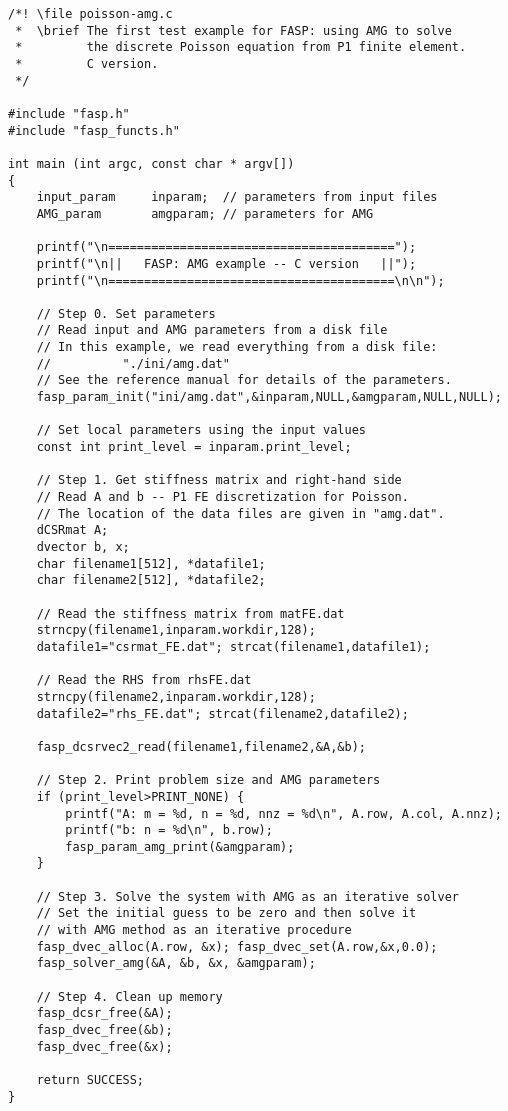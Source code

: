 \documentclass[11pt]{memoir}
\begin{document}
\begin{lstlisting}[stepnumber=1,firstnumber=1]
/*! \file poisson-amg.c
 *  \brief The first test example for FASP: using AMG to solve
 *         the discrete Poisson equation from P1 finite element.
 *         C version.
 */

#include "fasp.h"
#include "fasp_functs.h"

int main (int argc, const char * argv[])
{
    input_param     inparam;  // parameters from input files
    AMG_param       amgparam; // parameters for AMG

    printf("\n========================================");
    printf("\n||   FASP: AMG example -- C version   ||");
    printf("\n========================================\n\n");

    // Step 0. Set parameters
    // Read input and AMG parameters from a disk file
    // In this example, we read everything from a disk file:
    //          "./ini/amg.dat"
    // See the reference manual for details of the parameters.
    fasp_param_init("ini/amg.dat",&inparam,NULL,&amgparam,NULL,NULL);

    // Set local parameters using the input values
    const int print_level = inparam.print_level;

    // Step 1. Get stiffness matrix and right-hand side
    // Read A and b -- P1 FE discretization for Poisson.
    // The location of the data files are given in "amg.dat".
    dCSRmat A;
    dvector b, x;
    char filename1[512], *datafile1;
    char filename2[512], *datafile2;
	
    // Read the stiffness matrix from matFE.dat
    strncpy(filename1,inparam.workdir,128);
    datafile1="csrmat_FE.dat"; strcat(filename1,datafile1);

    // Read the RHS from rhsFE.dat
    strncpy(filename2,inparam.workdir,128);
    datafile2="rhs_FE.dat"; strcat(filename2,datafile2);

    fasp_dcsrvec2_read(filename1,filename2,&A,&b);

    // Step 2. Print problem size and AMG parameters
    if (print_level>PRINT_NONE) {
        printf("A: m = %d, n = %d, nnz = %d\n", A.row, A.col, A.nnz);
        printf("b: n = %d\n", b.row);
        fasp_param_amg_print(&amgparam);
    }

    // Step 3. Solve the system with AMG as an iterative solver
    // Set the initial guess to be zero and then solve it
    // with AMG method as an iterative procedure
    fasp_dvec_alloc(A.row, &x); fasp_dvec_set(A.row,&x,0.0);
    fasp_solver_amg(&A, &b, &x, &amgparam);

    // Step 4. Clean up memory
    fasp_dcsr_free(&A);
    fasp_dvec_free(&b);
    fasp_dvec_free(&x);

    return SUCCESS;
}
\end{lstlisting}
\end{document}
